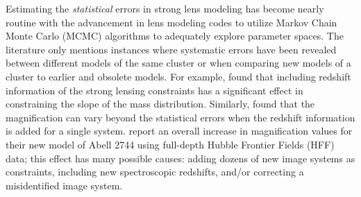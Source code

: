 Estimating the {\it statistical} errors in strong lens modeling has become nearly routine with the advancement in lens modeling codes to utilize Markov Chain Monte Carlo (MCMC) algorithms to adequately explore parameter spaces. The literature only mentions instances where systematic errors have been revealed between different models of the same cluster or when comparing new models of a cluster to earlier and obsolete models. For example, \citet{Smith:2009lr} found that including redshift information of the strong lensing constraints has a significant effect in constraining the slope of the mass distribution. Similarly, \citet{Johnson:2014tg} found that the magnification can vary beyond the statistical errors when the redshift information is added for a single system. \citet{Jauzac:2015xy} report an overall increase in magnification values for their new model of Abell 2744 using full-depth Hubble Frontier Fields (HFF) data; this effect has many possible causes: adding dozens of new image systems as constraints, including new spectroscopic redshifts, and/or correcting a misidentified image system.

